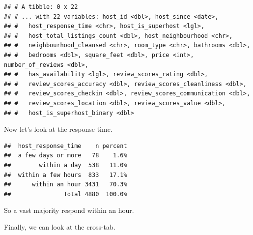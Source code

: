\documentclass[
]{book}
\newenvironment{Shaded}{\begin{snugshade}}{\end{snugshade}}
\newcommand{\DataTypeTok}[1]{\textcolor[rgb]{0.13,0.29,0.53}{#1}}
\newcommand{\DecValTok}[1]{\textcolor[rgb]{0.00,0.00,0.81}{#1}}
\newcommand{\KeywordTok}[1]{\textcolor[rgb]{0.13,0.29,0.53}{\textbf{#1}}}
\newcommand{\NormalTok}[1]{#1}
\newcommand{\OperatorTok}[1]{\textcolor[rgb]{0.81,0.36,0.00}{\textbf{#1}}}
\newcommand{\StringTok}[1]{\textcolor[rgb]{0.31,0.60,0.02}{#1}}
\begin{document}
\begin{Shaded}
\end{Shaded}

\begin{verbatim}
## # A tibble: 0 x 22
## # ... with 22 variables: host_id <dbl>, host_since <date>,
## #   host_response_time <chr>, host_is_superhost <lgl>,
## #   host_total_listings_count <dbl>, host_neighbourhood <chr>,
## #   neighbourhood_cleansed <chr>, room_type <chr>, bathrooms <dbl>,
## #   bedrooms <dbl>, square_feet <dbl>, price <int>, number_of_reviews <dbl>,
## #   has_availability <lgl>, review_scores_rating <dbl>,
## #   review_scores_accuracy <dbl>, review_scores_cleanliness <dbl>,
## #   review_scores_checkin <dbl>, review_scores_communication <dbl>,
## #   review_scores_location <dbl>, review_scores_value <dbl>,
## #   host_is_superhost_binary <dbl>
\end{verbatim}

Now let's look at the response time.

\begin{Shaded}
\end{Shaded}

\begin{verbatim}
##  host_response_time    n percent
##  a few days or more   78    1.6%
##        within a day  538   11.0%
##  within a few hours  833   17.1%
##      within an hour 3431   70.3%
##               Total 4880  100.0%
\end{verbatim}

So a vast majority respond within an hour.

Finally, we can look at the cross-tab.

\begin{Shaded}
\end{Shaded}
\end{document}
